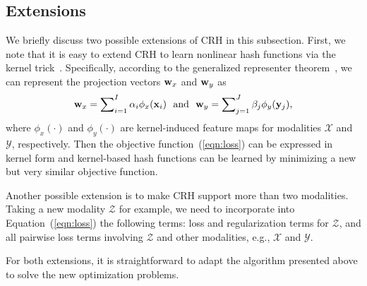 \subsection{Extensions}
\label{sec:moel:ext}
We briefly discuss two possible extensions of \mbox{CRH} in this subsection.  First, we note that it is easy to extend \mbox{CRH} to learn nonlinear hash functions via the kernel trick~\cite{shawe2004book}. Specifically, according to the generalized representer theorem~\cite{scholkopf2001colt}, we can represent the projection vectors ${\bf w}_{x}$ and ${\bf w}_{y}$ as
\begin{align}
{\bf w}_{x} = \sum\nolimits_{i=1}^{I}\alpha_{i}\phi_{x}({\bf x}_i) \ \ \mbox{and} \ \ {\bf w}_{y} = \sum\nolimits_{j=1}^{J}\beta_{j}\phi_{y}({\bf y}_j),\nonumber
\end{align}
where $\phi_{x}(\cdot)$ and $\phi_{y}(\cdot)$ are kernel-induced feature maps for modalities $\mathcal{X}$ and $\mathcal{Y}$, respectively. Then the objective function~(\ref{eqn:loss}) can be expressed in kernel form and kernel-based hash functions can be learned by minimizing a new but very similar objective function.


Another possible extension is to make \mbox{CRH} support more than two modalities. Taking a new modality $\mathcal{Z}$ for example, we need to incorporate into Equation~(\ref{eqn:loss}) the following terms: loss and regularization terms for $\mathcal{Z}$, and all pairwise loss terms involving $\mathcal{Z} $ and other modalities, e.g., $\mathcal{X} $ and $\mathcal{Y}$.

For both extensions, it is straightforward to adapt the algorithm presented above to solve the new optimization problems.

